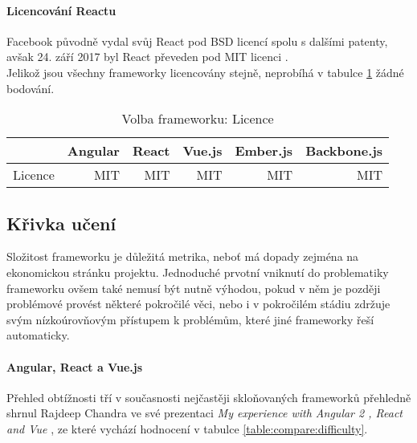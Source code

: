 \paragraph{Licencování Reactu} Facebook původně vydal svůj React pod BSD licencí spolu s dalšími patenty, avšak 24. září 2017 byl React převeden pod MIT licenci \cite{react-license-commit, react-license}.
\\
Jelikož jsou všechny frameworky licencovány stejně, neprobíhá v tabulce \ref{table:compare:license} žádné bodování.

\begin{table}[h]
\caption{Volba frameworku: Licence}
\label{table:compare:license}
\begin{tabular}{lrrrrr}
\hline
                                         & Angular                     & React                     & Vue.js                     & Ember.js                     & Backbone.js               \\ \hline
Licence                                  & MIT                         & MIT                       & MIT                        & MIT                          & MIT                       \\
\end{tabular}
\end{table}


\subsection{Křivka učení}

Složitost frameworku je důležitá metrika, neboť má dopady zejména na ekonomickou stránku projektu. Jednoduché prvotní vniknutí do problematiky frameworku ovšem také nemusí být nutně výhodou, pokud v něm je později problémové provést některé pokročilé věci, nebo i v pokročilém stádiu zdržuje svým nízkoúrovňovým přístupem k problémům, které jiné frameworky řeší automaticky.

\paragraph{Angular, React a Vue.js} Přehled obtížnosti tří v současnosti nejčastěji skloňovaných frameworků přehledně shrnul Rajdeep Chandra ve své prezentaci \emph{My experience with Angular 2 , React and Vue} \cite{frameworks-3compare}, ze které vychází hodnocení v tabulce \ref{table:compare:difficulty}.

